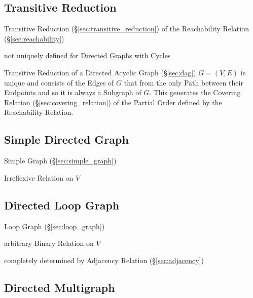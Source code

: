 \subsection{Transitive Reduction}
\label{sec:transitive_reduction_graph}

Transitive Reduction (\S\ref{sec:transitive_reduction}) of the
Reachability Relation (\S\ref{sec:reachability})

not uniquely defined for Directed Graphs with Cycles

Transitive Reduction of a Directed Acyclic Graph (\S\ref{sec:dag}) $G
= (V,E)$ is unique and consists of the Edges of $G$ that from the only
Path between their Endpoints and so it is always a Subgraph of $G$.
This generates the Covering Relation (\S\ref{sec:covering_relation})
of the Partial Order defined by the Reachability Relation.



\subsection{Simple Directed Graph}\label{sec:simple_directed}

Simple Graph (\S\ref{sec:simple_graph})

Irreflexive Relation on $V$



\subsection{Directed Loop Graph}\label{sec:directed_loop_graph}

Loop Graph (\S\ref{sec:loop_graph})

arbitrary Binary Relation on $V$

completely determined by Adjacency Relation (\S\ref{sec:adjacency})



\subsection{Directed Multigraph}\label{sec:directed_multigraph}

